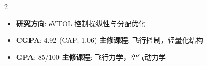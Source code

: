 \documentclass[10pt,a4paper,ragged2e,withhyper]{altacv}
\begin{document}
\begin{paracol}{2}
            \begin{itemize}
                \item \textbf{研究方向}: \small eVTOL 控制操纵性与分配优化
            \end{itemize}
            \bigskip
            
            \begin{itemize}
                \item \textbf{CGPA}: 4.92 \small (CAP: 1.06) \normalsize  \hspace{1em} \textbf{主修课程}: 飞行控制，轻量化结构
            \end{itemize}
            \bigskip
            
            
            \begin{itemize}
                \item \textbf{GPA}: 85/100 \hspace{5em} \textbf{主修课程}: 飞行力学，空气动力学
            \end{itemize}
        
        
        \renewcommand{\cvevent}[4]{%
          {\large\color{emphasis}#1}
          \ifstrequal{#2}{}{}{\large{\color{accent}#2}}
          \par\medskip\normalsize
          \ifstrequal{#3}{}{}{{\small\makebox[0.5\linewidth][l]{\color{accent}\faCalendar\color{emphasis}~#3}}}
          \ifstrequal{#4}{}{}{{\small\makebox[0.5\linewidth][l]{\color{accent}\faDev\color{emphasis}~#4}}}\par
          \medskip\normalsize%
        }
        

\end{paracol}
\end{document}
